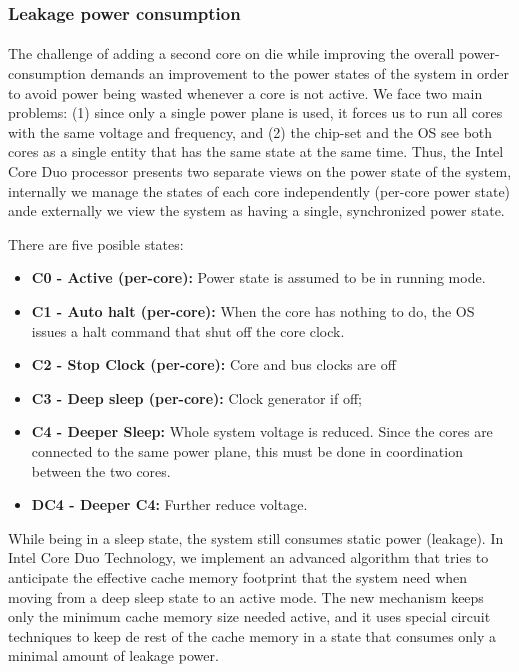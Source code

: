 \subsubsection{Leakage power consumption}
\paragraph{} The challenge of adding a second core on die while improving the overall power-consumption demands an improvement to the power states of the system in order to avoid power being wasted whenever a core is not active. We face two main problems: (1) since only a single power plane is used, it forces us to run all cores with the same voltage and frequency, and (2) the chip-set and the OS see both cores as a single entity that has the same state at the same time. Thus, the Intel Core Duo processor presents two separate views on the power state of the system, internally we manage the states of each core independently (per-core power state) ande externally we view the system as having a single, synchronized power state.

There are five posible states:

\begin{itemize}
	\item \textbf{C0 - Active (per-core):} Power state is assumed to be in running mode.
	\item \textbf{C1 - Auto halt (per-core):} When the core has nothing to do, the OS issues a halt command that shut off the core clock.
	\item \textbf{C2 - Stop Clock (per-core):} Core and bus clocks are off
	\item \textbf{C3 - Deep sleep (per-core):} Clock generator if off;
	\item \textbf{C4 - Deeper Sleep:} Whole system voltage is reduced. Since the cores are connected to the same power plane, this must be done in coordination between the two cores.
	\item \textbf{DC4 - Deeper C4:}	Further reduce voltage.
\end{itemize}

While being in a sleep state, the system still consumes static power (leakage). In Intel Core Duo Technology, we implement an advanced algorithm that tries to anticipate the effective cache memory footprint that the system need when moving from a deep sleep state to an active mode. The new mechanism keeps only the minimum cache memory size needed active, and it uses special circuit techniques to keep de rest of the cache memory in a state that consumes only a minimal amount of leakage power.

